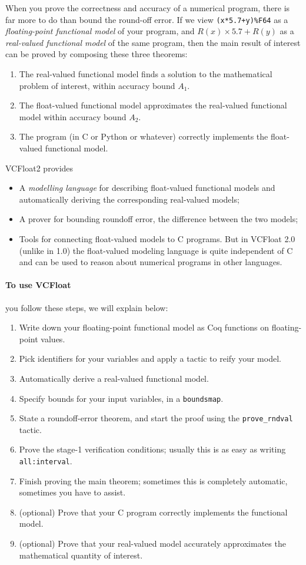 \documentclass[article]{memoir}
\begin{document}
When you prove the correctness and accuracy of a numerical program,
there is far more to do than bound the round-off error.
If we view \lstinline{(x*5.7+y)%F64} as a \emph{floating-point functional model}
  of your program, and $R(x)\times 5.7+R(y)$ as a
  \emph{real-valued functional model} of the same program, then
  the main result of interest can be proved by composing
  these three theorems:
\begin{enumerate}
  \item The real-valued functional model finds a solution to
    the mathematical problem of interest, within accuracy bound $A_1$.
  \item The float-valued functional model approximates the
    real-valued functional model within accuracy bound $A_2$.
  \item The program (in C or Python or whatever) correctly implements
    the float-valued functional model.
\end{enumerate}
VCFloat2 provides
\begin{itemize}
\item A \emph{modelling language} for describing float-valued functional
  models and automatically deriving the corresponding real-valued models;
\item A prover for bounding roundoff error, the difference between the two models;
\item Tools for connecting float-valued models to C programs.  But
  in VCFloat 2.0 (unlike in 1.0) the float-valued modeling language
  is quite independent of C and can be used to reason about numerical
  programs in other languages.
\end{itemize}

\paragraph{To use VCFloat} you follow these steps, we will explain below:
\begin{enumerate}
\item Write down your floating-point functional model as Coq functions on floating-point values.
\item Pick identifiers for your variables and apply a tactic to reify your model.
\item Automatically derive a real-valued functional model.
\item Specify bounds for your input variables, in a \lstinline{boundsmap}.
\item State a roundoff-error theorem, and start the proof using the
  \lstinline{prove_rndval} tactic.
\item Prove the stage-1 verification conditions; usually this is as easy as
  writing \lstinline{all:interval}.
\item Finish proving the main theorem; sometimes this is completely automatic, sometimes you have to assist.
\item (optional) Prove that your C program correctly implements the functional model.
\item (optional) Prove that your real-valued model accurately approximates the
  mathematical quantity of interest.
\end{enumerate}
\end{document}
